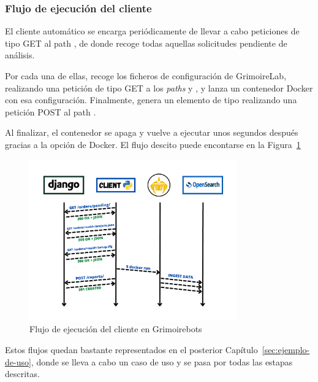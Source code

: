 \subsubsection{Flujo de ejecución del cliente}

El cliente automático se encarga periódicamente de llevar a cabo peticiones de tipo GET al path , de donde recoge todas aquellas solicitudes pendiente de análisis.

Por cada una de ellas, recoge los ficheros de configuración de GrimoireLab, realizando una petición de tipo GET a los \emph{paths}  y , y lanza un contenedor Docker con esa configuración. Finalmente, genera un elemento de tipo  realizando una petición POST al path .

Al finalizar, el contenedor se apaga y vuelve a ejecutar unos segundos después gracias a la opción  de Docker. El flujo descito puede encontarse en la Figura~{\ref{fig:grimoirebots_client_workflow}}

\begin{figure}[ht]
    \centering
    \includegraphics[width=0.8\textwidth]{Figures/grimoirebots_ii_backend}
    \decoRule
    \caption[Grimoirebots (flujo del cliente)]{Flujo de ejecución del cliente en Grimoirebots}
    \label{fig:grimoirebots_client_workflow}
\end{figure}

Estos flujos quedan bastante representados en el posterior Capítulo~{\ref{sec:ejemplo-de-uso}}, donde se lleva a cabo un caso de uso y se pasa por todas las estapas descritas.



